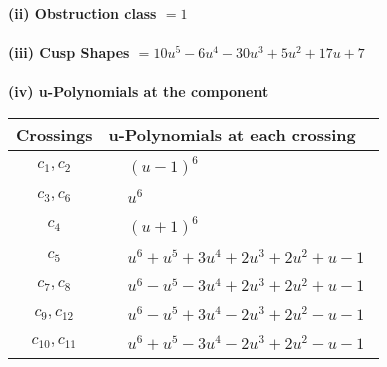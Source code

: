 \documentclass[1p]{elsarticle_modified}
\theoremstyle{definition}
\begin{document}
\flushleft \textbf{(ii) Obstruction class $= 1$}\\~\\
\flushleft \textbf{(iii) Cusp Shapes $= 10 u^5-6 u^4-30 u^3+5 u^2+17 u+7$}\\~\\
\newpage\renewcommand{\arraystretch}{1}
\flushleft \textbf{(iv) u-Polynomials at the component}\newline \\
\begin{tabular}{m{50pt}|m{274pt}}
Crossings & \hspace{64pt}u-Polynomials at each crossing \\
\hline $$\begin{aligned}c_{1},c_{2}\end{aligned}$$&$\begin{aligned}
&(u-1)^6
\end{aligned}$\\
\hline $$\begin{aligned}c_{3},c_{6}\end{aligned}$$&$\begin{aligned}
&u^6
\end{aligned}$\\
\hline $$\begin{aligned}c_{4}\end{aligned}$$&$\begin{aligned}
&(u+1)^6
\end{aligned}$\\
\hline $$\begin{aligned}c_{5}\end{aligned}$$&$\begin{aligned}
&u^6+u^5+3 u^4+2 u^3+2 u^2+u-1
\end{aligned}$\\
\hline $$\begin{aligned}c_{7},c_{8}\end{aligned}$$&$\begin{aligned}
&u^6- u^5-3 u^4+2 u^3+2 u^2+u-1
\end{aligned}$\\
\hline $$\begin{aligned}c_{9},c_{12}\end{aligned}$$&$\begin{aligned}
&u^6- u^5+3 u^4-2 u^3+2 u^2- u-1
\end{aligned}$\\
\hline $$\begin{aligned}c_{10},c_{11}\end{aligned}$$&$\begin{aligned}
&u^6+u^5-3 u^4-2 u^3+2 u^2- u-1
\end{aligned}$\\
\hline
\end{tabular}\\~\\
\end{document}
